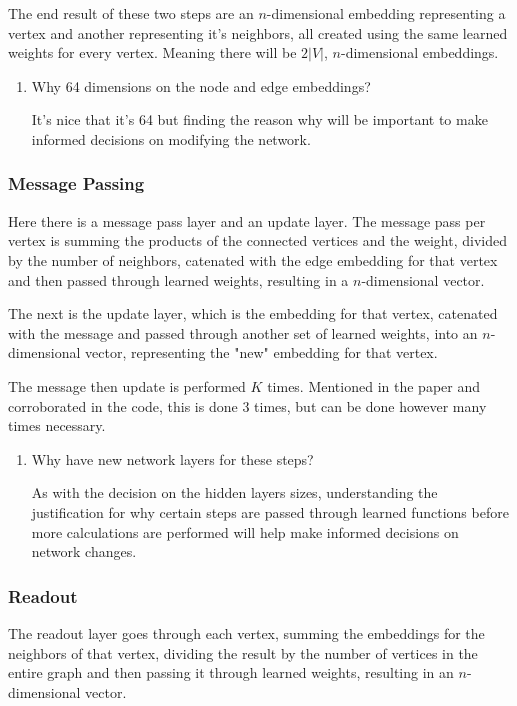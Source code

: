 \documentclass{article}
\begin{document}
The end result of these two steps are an $n$-dimensional embedding representing a vertex and another representing it's neighbors, all created using the same learned weights for every vertex. Meaning there will be $2|V|$, $n$-dimensional embeddings. 


\begin{enumerate}
    \item Why 64 dimensions on the node and edge embeddings? 
    
    It's nice that it's 64 but finding the reason why will be important to make informed decisions on modifying the network.
\end{enumerate}

\subsubsection{Message Passing}

Here there is a message pass layer and an update layer. The message pass per vertex is summing the products of the connected vertices and the weight, divided by the number of neighbors, catenated with the edge embedding for that vertex and then passed through learned weights, resulting in a $n$-dimensional vector.

The next is the update layer, which is the embedding for that vertex, catenated with the message and passed through another set of learned weights, into an $n$-dimensional vector, representing the "new" embedding for that vertex. 

The message then update is performed $K$ times. Mentioned in the paper and corroborated in the code, this is done 3 times, but can be done however many times necessary.

\begin{enumerate}
    \item Why have new network layers for these steps?
    
    As with the decision on the hidden layers sizes, understanding the justification for why certain steps are passed through learned functions before more calculations are performed will help make informed decisions on network changes.
\end{enumerate}

\subsubsection{Readout}

The readout layer goes through each vertex, summing the embeddings for the neighbors of that vertex, dividing the result by the number of vertices in the entire graph and then passing it through learned weights, resulting in an $n$-dimensional vector.
\end{document}
